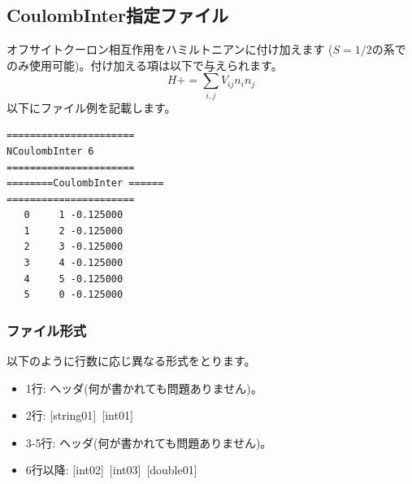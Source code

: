 \newpage
\subsection{CoulombInter指定ファイル}
オフサイトクーロン相互作用をハミルトニアンに付け加えます{ ($S=1/2$の系でのみ使用可能)}。付け加える項は以下で与えられます。
\begin{equation}
H+=\sum_{i,j}V_{ij} n_ {i}n_{j}
\end{equation}
以下にファイル例を記載します。

\begin{minipage}{12.5cm}
\begin{screen}
\begin{verbatim}
====================== 
NCoulombInter 6  
====================== 
========CoulombInter ====== 
====================== 
   0     1 -0.125000
   1     2 -0.125000
   2     3 -0.125000
   3     4 -0.125000
   4     5 -0.125000
   5     0 -0.125000
\end{verbatim}
\end{screen}
\end{minipage}

\subsubsection{ファイル形式}
以下のように行数に応じ異なる形式をとります。
 \begin{itemize}
   \item  1行:  ヘッダ(何が書かれても問題ありません)。
   \item  2行:   [string01]~[int01]
   \item  3-5行:  ヘッダ(何が書かれても問題ありません)。
   \item  6行以降:
   [int02]~[int03]~[double01] 
  \end{itemize}
